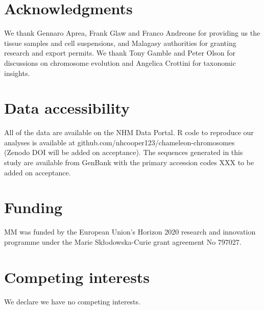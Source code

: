 \documentclass[a4paper, 12pt]{article}
\begin{document}
\section*{Acknowledgments}
We thank Gennaro Aprea, Frank Glaw and Franco Andreone for providing us the tissue samples and cell suspensions, and Malagasy authorities for granting research and export permits. We thank Tony Gamble and Peter Olson for discussions on chromosome evolution and Angelica Crottini for taxonomic insights.

\section*{Data accessibility}\label{data-code-and-materials}
All of the data are available on the NHM Data Portal\cite{chameleon-data}. 
R code to reproduce our analyses is available at github.com/nhcooper123/chameleon-chromosomes (Zenodo DOI will be added on acceptance\cite{coopercode2022}). 
The sequences generated in this study are available from GenBank with the primary accession codes XXX to be added on acceptance.

\section*{Funding}
MM was funded by the European Union’s Horizon 2020 research and innovation programme under the Marie Sk\l{}odowska-Curie grant agreement No 797027.

\section{Competing interests}
We declare we have no competing interests.



\end{document}
